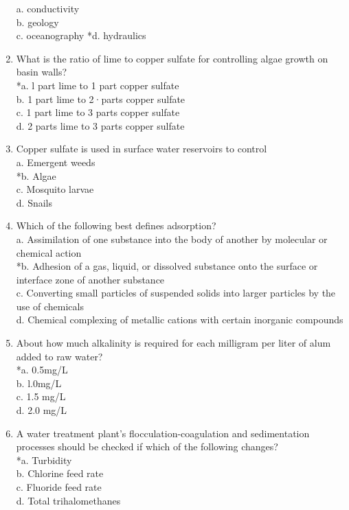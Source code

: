 \begin{enumerate}
a.  conductivity\\
b.  geology\\
c.  oceanography
*d.  hydraulics\\
\item What is the ratio of lime to copper sulfate for controlling algae growth on basin walls?\\
*a.	l part lime to 1 part copper sulfate\\
b.	1 part lime to 2·parts copper sulfate\\
c.	1 part lime to 3 parts copper sulfate\\
d.	2 parts lime to 3 parts copper sulfate\\
\item Copper sulfate is used in surface water reservoirs to control\\
a.	Emergent  weeds\\
*b.	Algae\\
c.	Mosquito larvae\\
d.	Snails\\
\item Which of the following best defines adsorption?\\
a.	Assimilation of one substance into the body of another by molecular or chemical action\\
*b.	Adhesion of a gas, liquid, or dissolved substance onto the surface or interface zone of another substance\\
c.	Converting small particles of suspended solids into larger particles by the use of chemicals\\
d.	Chemical complexing of metallic cations with certain inorganic compounds\\
\item About how much alkalinity is required for each milligram per liter of alum added to raw water?\\
*a.	0.5mg/L\\
b.	l.0mg/L\\
c.	1.5 mg/L\\
d.	2.0 mg/L\\
\item A water treatment plant's flocculation-coagulation and sedimentation processes should be checked if which of the following changes?\\
*a.	Turbidity\\
b.	Chlorine feed rate\\
c.	Fluoride feed rate\\
d.	Total trihalomethanes\\

\end{enumerate}
